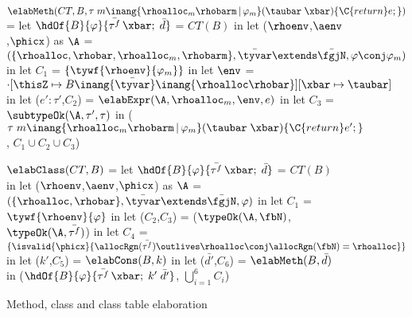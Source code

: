 \begin{figure}

\begin{codeml}
$\elabMeth(CT, B, \tau \; m\inang{\rhoalloc_m\rhobarm \,|\, \varphi_m} (\taubar \; \xbar)\{\C{return} e;\})$ = 
  let $\hdOf{B}{\varphi}\{\bar{\tau^f}\,\xbar;\;\bar{d}\}$ = $CT(B)$ in
  let ($\rhoenv$,$\aenv$,$\phicx$) as $\A$ = 
            $(\{\rhoalloc,\rhobar,\rhoalloc_m,\rhobarm\},\bar{\tyvar} \extends \bar{\fgjN},\varphi \conj \varphi_m)$ in
  let $C_1$ = $\{\tywf{\rhoenv}{\varphi_m}\}$ in
  let $\env$ = $\cdot[\thisZ \mapsto B\inang{\bar{\tyvar}}\inang{\rhoalloc\rhobar}][\xbar \mapsto \taubar]$ in
  let ($e':\tau'$,$C_2$) = $\elabExpr (\A,\rhoalloc_m,\env,e)$ in
  let $C_3$ = $\subtypeOk({\A},{\tau'},{\tau})$ in
    ($\tau \; m\inang{\rhoalloc_m\rhobarm \,|\, \varphi_m} (\taubar \;
    \xbar)\{\C{return} e';\}$, $C_1 \cup C_2 \cup C_3$)
\end{codeml}

\begin{codeml}
$\elabClass(CT,B)$ = 
  let $\hdOf{B}{\varphi}\{\bar{\tau^f}\,\xbar;\;\bar{d}\}$ = $CT(B)$ in
  let ($\rhoenv$,$\aenv$,$\phicx$) as $\A$ = $(\{\rhoalloc,\rhobar\},\bar{\tyvar} \extends \bar{\fgjN},\varphi)$ in
  let $C_1$ = $\tywf{\rhoenv}{\varphi}$ in
  let ($C_2$,$C_3$) = ($\typeOk({\A},{\fbN})$,$\typeOk({\A},{\bar{\tau^f}})$) in
  let $C_4$ = $\{\isvalid{\phicx}{\allocRgn(\bar{\tau^f}) \outlives \rhoalloc \conj \allocRgn(\fbN) = \rhoalloc}\}$ in
  let ($k'$,$C_5$) = $\elabCons(B,k)$ in
  let ($\bar{d'}$,$C_6$) = $\elabMeth(B,\bar{d})$ in
    ($\hdOf{B}{\varphi}\{\bar{\tau^f}\,\xbar;\;k'\;\bar{d'}\}$, $\bigcup_{i=1}^6 C_i$)
\end{codeml}
%
%       

\caption{Method, class and class table elaboration}
\label{fig:fb-elabmeth}
\end{figure}

